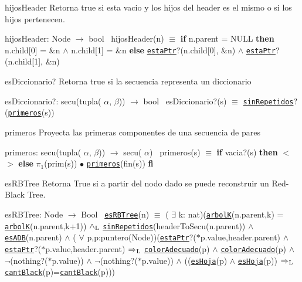 \begin{DoxyParagraph}{hijos\+Header}
Retorna true si esta vacio y los hijos del header es el mismo o si los hijos pertenecen.

hijos\+Header\+: Node $\to$ bool~\newline
 hijos\+Header(n) $\equiv$ {\bfseries if} n.\+parent = N\+U\+LL {\bfseries then} n.\+child\mbox{[}0\mbox{]} = \&n $\land$ n.\+child\mbox{[}1\mbox{]} = \&n {\bfseries else} \href{axiomas.html#estaPtr}{\tt esta\+Ptr}?(n.\+child\mbox{[}0\mbox{]}, \&n) $\land$ \href{axiomas.html#estaPtr}{\tt esta\+Ptr}?(n.\+child\mbox{[}1\mbox{]}, \&n) 
\end{DoxyParagraph}


\begin{DoxyParagraph}{es\+Diccionario?}
Retorna true si la secuencia representa un diccionario

es\+Diccionario?\+: secu(tupla( $\alpha$, $\beta$)) $\to$ bool~\newline
 es\+Diccionario?(s) $\equiv$ \href{axiomas.html#sinRepetidos}{\tt sin\+Repetidos}?(\href{axiomas.html#primeros}{\tt primeros}(s)) 
\end{DoxyParagraph}


\begin{DoxyParagraph}{primeros}
Proyecta las primeras componentes de una secuencia de pares

primeros\+: secu(tupla( $\alpha$, $\beta$)) $\to$ secu( $\alpha$)~\newline
 primeros(s) $\equiv$ {\bfseries if} vacia?(s) {\bfseries then} $<$$>$ {\bfseries else} $\pi_1$(prim(s)) $\bullet$ \href{axiomas.html#primeros}{\tt primeros}(fin(s)) {\bfseries fi} 
\end{DoxyParagraph}


\begin{DoxyParagraph}{es\+R\+B\+Tree}
Retorna True si a partir del nodo dado se puede reconstruir un Red-\/\+Black Tree.

es\+R\+B\+Tree\+: Node $\to$ Bool~\newline
 \href{axiomas.html#esRBTree}{\tt es\+R\+B\+Tree}(n) $\equiv$ ( $\exists$ k\+: nat)(\href{axiomas.html#arbolK}{\tt arbolK}(n.\+parent,k) = \href{axiomas.html#arbolK}{\tt arbolK}(n.\+parent,k+1)) $\land_{\rm L}$ \href{axiomas.html#sinRepetidos}{\tt sin\+Repetidos}(header\+To\+Secu(n.\+parent)) $\land$ \href{axiomas.html#esADB}{\tt es\+A\+DB}(n.\+parent) $\land$ ( $\forall$ p,p\textquotesingle{}\+:puntero(\+Node))(\href{axiomas.html#estaPtr}{\tt esta\+Ptr}?($\ast$p.value,header.\+parent) $\land$ \href{axiomas.html#estaPtr}{\tt esta\+Ptr}?($\ast$p\textquotesingle{}.value,header.\+parent) $\Rightarrow_{\rm L}$ \href{axiomas.html#colorAdecuado}{\tt color\+Adecuado}(p) $\land$ \href{axiomas.html#colorAdecuado}{\tt color\+Adecuado}(p\textquotesingle{}) $\land$ $\lnot$(nothing?($\ast$p.value)) $\land$ $\lnot$(nothing?($\ast$p\textquotesingle{}.value)) $\land$ ((\href{axiomas.html#esHoja}{\tt es\+Hoja}(p) $\land$ \href{axiomas.html#esHoja}{\tt es\+Hoja}(p\textquotesingle{})) $\Rightarrow_{\rm L}$ \href{axiomas.html#cantBlack}{\tt cant\+Black}(p)=\href{axiomas.html#cantBlack}{\tt cant\+Black}(p\textquotesingle{}))) 
\end{DoxyParagraph}


